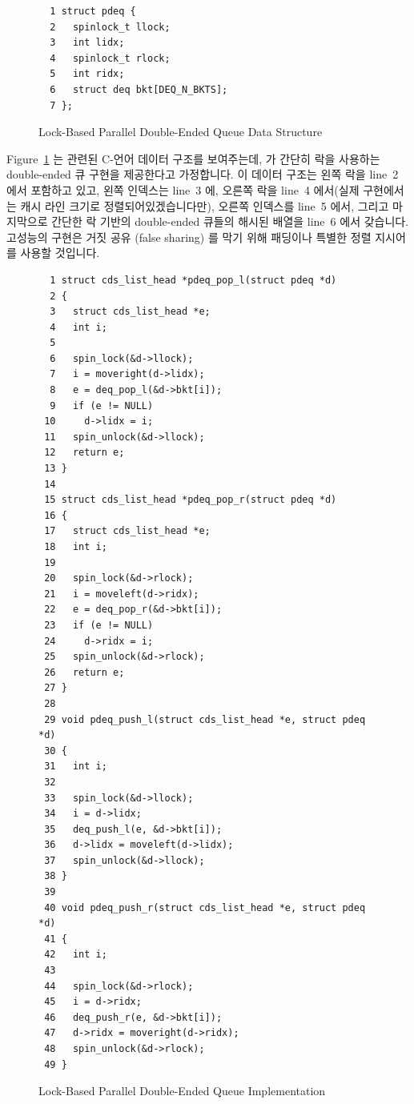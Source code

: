 \begin{figure}[tbp]
{ \scriptsize
\begin{verbatim}
  1 struct pdeq {
  2   spinlock_t llock;
  3   int lidx;
  4   spinlock_t rlock;
  5   int ridx;
  6   struct deq bkt[DEQ_N_BKTS];
  7 };
\end{verbatim}
}
\caption{Lock-Based Parallel Double-Ended Queue Data Structure}
\label{fig:SMPdesign:Lock-Based Parallel Double-Ended Queue Data Structure}
\end{figure}

Figure~\ref{fig:SMPdesign:Lock-Based Parallel Double-Ended Queue Data Structure}
는 관련된 C-언어 데이터 구조를 보여주는데,  가 간단히 락을
사용하는 double-ended 큐 구현을 제공한다고 가정합니다.
이 데이터 구조는 왼쪽 락을 line~2 에서 포함하고 있고, 왼쪽 인덱스는 line~3 에,
오른쪽 락을 line~4 에서(실제 구현에서는 캐시 라인 크기로 정렬되어있겠습니다만),
오른쪽 인덱스를 line~5 에서, 그리고 마지막으로 간단한 락 기반의 double-ended
큐들의 해시된 배열을 line~6 에서 갖습니다.
고성능의 구현은 거짓 공유 (false sharing) 를 막기 위해 패딩이나 특별한 정렬
지시어를 사용할 것입니다.

\begin{figure}[bp]
{ \scriptsize
\begin{verbatim}
  1 struct cds_list_head *pdeq_pop_l(struct pdeq *d)
  2 {
  3   struct cds_list_head *e;
  4   int i;
  5 
  6   spin_lock(&d->llock);
  7   i = moveright(d->lidx);
  8   e = deq_pop_l(&d->bkt[i]);
  9   if (e != NULL)
 10     d->lidx = i;
 11   spin_unlock(&d->llock);
 12   return e;
 13 }
 14 
 15 struct cds_list_head *pdeq_pop_r(struct pdeq *d)
 16 {
 17   struct cds_list_head *e;
 18   int i;
 19 
 20   spin_lock(&d->rlock);
 21   i = moveleft(d->ridx);
 22   e = deq_pop_r(&d->bkt[i]);
 23   if (e != NULL)
 24     d->ridx = i;
 25   spin_unlock(&d->rlock);
 26   return e;
 27 }
 28 
 29 void pdeq_push_l(struct cds_list_head *e, struct pdeq *d)
 30 {
 31   int i;
 32 
 33   spin_lock(&d->llock);
 34   i = d->lidx;
 35   deq_push_l(e, &d->bkt[i]);
 36   d->lidx = moveleft(d->lidx);
 37   spin_unlock(&d->llock);
 38 }
 39 
 40 void pdeq_push_r(struct cds_list_head *e, struct pdeq *d)
 41 {
 42   int i;
 43 
 44   spin_lock(&d->rlock);
 45   i = d->ridx;
 46   deq_push_r(e, &d->bkt[i]);
 47   d->ridx = moveright(d->ridx);
 48   spin_unlock(&d->rlock);
 49 }
\end{verbatim}
}
\caption{Lock-Based Parallel Double-Ended Queue Implementation}
\label{fig:SMPdesign:Lock-Based Parallel Double-Ended Queue Implementation}
\end{figure}

